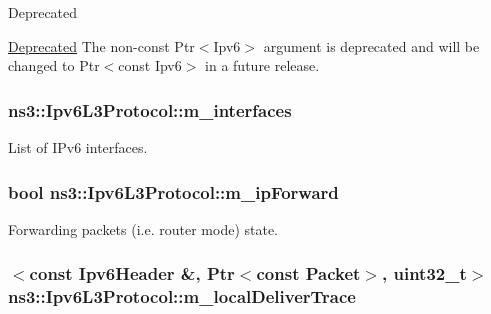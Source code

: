 \begin{DoxyRefDesc}{Deprecated}
\item[\hyperlink{deprecated__deprecated000015}{Deprecated}]The non-\/const {\ttfamily Ptr$<$\+Ipv6$>$} argument is deprecated and will be changed to {\ttfamily Ptr$<$const Ipv6$>$} in a future release. \end{DoxyRefDesc}
\subsubsection[{\texorpdfstring{m\+\_\+interfaces}{m_interfaces}}]{ ns3\+::\+Ipv6\+L3\+Protocol\+::m\+\_\+interfaces\hspace{0.3cm}{\ttfamily [private]}}\hypertarget{classns3_1_1Ipv6L3Protocol_a425d8738fd30fbc9345d57cfddd0d6d0}{}\label{classns3_1_1Ipv6L3Protocol_a425d8738fd30fbc9345d57cfddd0d6d0}


List of I\+Pv6 interfaces. 

\subsubsection[{\texorpdfstring{m\+\_\+ip\+Forward}{m_ipForward}}]{\setlength{\rightskip}{0pt plus 5cm}bool ns3\+::\+Ipv6\+L3\+Protocol\+::m\+\_\+ip\+Forward\hspace{0.3cm}{\ttfamily [private]}}\hypertarget{classns3_1_1Ipv6L3Protocol_a3dbdeac3cc4ec17f5a6ab9475fc8e7a8}{}\label{classns3_1_1Ipv6L3Protocol_a3dbdeac3cc4ec17f5a6ab9475fc8e7a8}


Forwarding packets (i.\+e. router mode) state. 

\subsubsection[{\texorpdfstring{m\+\_\+local\+Deliver\+Trace}{m_localDeliverTrace}}]{$<$const {\bf Ipv6\+Header} \&, {\bf Ptr}$<$const {\bf Packet}$>$, uint32\+\_\+t$>$ ns3\+::\+Ipv6\+L3\+Protocol\+::m\+\_\+local\+Deliver\+Trace\hspace{0.3cm}{\ttfamily [private]}}\hypertarget{classns3_1_1Ipv6L3Protocol_afd8b2aef3c54456b509cdc7356db577e}{}\label{classns3_1_1Ipv6L3Protocol_afd8b2aef3c54456b509cdc7356db577e}


